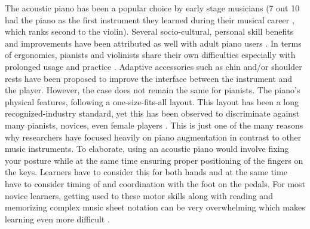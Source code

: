 \documentclass[sigconf, screen, review]{acmart}
\begin{document}
The acoustic piano has been a popular choice by early stage musicians (7 out 10 had the piano as the first instrument they learned during their musical career \cite{sloboda1992transitions}, which ranks second to the violin). Several socio-cultural, personal skill benefits and improvements have been attributed as well with adult piano users \cite{jutras2006benefits}. In terms of ergonomics, pianists and violinists share their own difficulties especially with prolonged usage and practice \cite{chi2020ergonomics}. Adaptive accessories such as chin and/or shoulder rests have been proposed to improve the interface between the instrument and the player. However, the case does not remain the same for pianists. The piano's physical features, following a one-size-fits-all layout. This layout has been a long recognized-industry standard, yet this has been observed to discriminate against many pianists, novices, even female players \cite{boyle2012experience}. This is just one of the many reasons why researchers have focused heavily on piano augmentation in contrast to other music instruments. To elaborate, using an acoustic piano would involve fixing your posture while at the same time ensuring proper positioning of the fingers on the keys. Learners have to consider this for both hands and at the same time have to consider timing of and coordination with the foot on the pedals. For most novice learners, getting used to these motor skills along with reading and memorizing complex music sheet notation can be very overwhelming which makes learning even more difficult \cite{highben2004effects}. 
\end{document}

